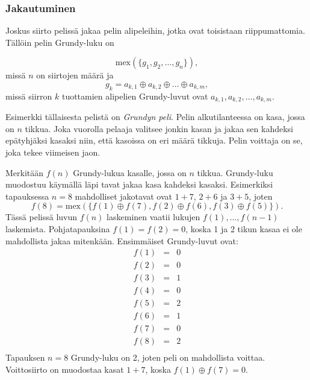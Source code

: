 \subsubsection{Jakautuminen}

Joskus siirto pelissä jakaa pelin alipeleihin,
jotka ovat toisistaan riippumattomia.
Tällöin pelin Grundy-luku on

\[\textrm{mex}(\{g_1, g_2, \ldots, g_n \}),\]
missä $n$ on siirtojen määrä ja
\[g_k = a_{k,1} \oplus a_{k,2} \oplus \ldots \oplus a_{k,m},\]
missä siirron $k$ tuottamien alipelien
Grundy-luvut ovat $a_{k,1},a_{k,2},\ldots,a_{k,m}$.


Esimerkki tällaisesta pelistä on \textit{Grundyn peli}.
Pelin alkutilanteessa on kasa, jossa on $n$ tikkua.
Joka vuorolla pelaaja valitsee jonkin kasan
ja jakaa sen kahdeksi epätyhjäksi kasaksi
niin, että kasoissa on eri määrä tikkuja.
Pelin voittaja on se, joka tekee viimeisen jaon.

Merkitään $f(n)$ Grundy-lukua kasalle,
jossa on $n$ tikkua.
Grundy-luku muodostuu käymällä läpi tavat
jakaa kasa kahdeksi kasaksi.
Esimerkiksi tapauksessa $n=8$ mahdolliset jakotavat
ovat $1+7$, $2+6$ ja $3+5$, joten
\[f(8)=\textrm{mex}(\{f(1) \oplus f(7), f(2) \oplus f(6), f(3) \oplus f(5)\}).\]
Tässä pelissä luvun $f(n)$ laskeminen vaatii lukujen
$f(1),\ldots,f(n-1)$ laskemista.
Pohjatapauksina $f(1)=f(2)=0$, koska 1 ja 2 tikun
kasaa ei ole mahdollista jakaa mitenkään.
Ensimmäiset Grundy-luvut ovat:
\[
\begin{array}{lcl}
f(1) & = & 0 \\
f(2) & = & 0 \\
f(3) & = & 1 \\
f(4) & = & 0 \\
f(5) & = & 2 \\
f(6) & = & 1 \\
f(7) & = & 0 \\
f(8) & = & 2 \\
\end{array}
\]
Tapauksen $n=8$ Grundy-luku on 2, joten peli on mahdollista
voittaa.
Voittosiirto on muodostaa kasat $1+7$,
koska $f(1) \oplus f(7) = 0$.